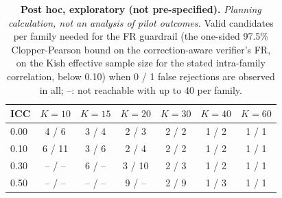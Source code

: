 \begin{table}[t]\centering\footnotesize
\caption{\textbf{Post hoc, exploratory (not pre-specified).} \emph{Planning calculation, not an analysis of pilot outcomes.} Valid candidates per family needed for the FR guardrail (the one-sided 97.5\% Clopper-Pearson bound on the correction-aware verifier's FR, on the Kish effective sample size for the stated intra-family correlation, below 0.10) when 0 / 1 false rejections are observed in all; --: not reachable with up to 40 per family.}\label{tab:plan-fr}
\begin{tabular}{lcccccc}\toprule ICC & $K=10$ & $K=15$ & $K=20$ & $K=30$ & $K=40$ & $K=60$ \\\midrule
0.00 & 4 / 6 & 3 / 4 & 2 / 3 & 2 / 2 & 1 / 2 & 1 / 1 \\
0.10 & 6 / 11 & 3 / 6 & 2 / 4 & 2 / 2 & 1 / 2 & 1 / 1 \\
0.30 & -- / -- & 6 / -- & 3 / 10 & 2 / 3 & 1 / 2 & 1 / 1 \\
0.50 & -- / -- & -- / -- & 9 / -- & 2 / 9 & 1 / 3 & 1 / 1 \\
\bottomrule\end{tabular}\end{table}
